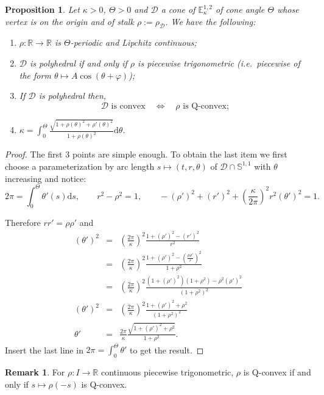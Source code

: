 \documentclass[a4paper,12pt]{article}
\def\D{\mathcal{D}}
\def\d{\mathrm{d}}
\def\D{\mathcal{D}}
\def\RR{\mathbb{R}}
\newcommand{\mass}[1]{{\mathbb E}^{1,2}_{#1}}
\def\SS{\mathbb{S}}
\def\Cone{\mathcal D}
\def\d{\mathrm{d}}
\def\D{\mathcal{D}}
\newtheorem{prop}[lem]{Proposition}
\theoremstyle{definition}
\newtheorem*{rem}{Remark}			 %
\begin{document}
					\begin{prop}\label{prop:T_convexe_base}
					Let $\kappa>0$, $\Theta>0$ and $\Cone$ a cone of $\mass{\kappa}$ of cone angle $\Theta$ whose vertex is on the origin and of stalk $\rho:=\rho_{\Cone}$. We have the following:
					\begin{enumerate}
					\item $\rho: \RR \rightarrow \RR$ is $\Theta$-periodic and Lipchitz continuous;
					\item $\D$ is polyhedral if and only if $\rho$ is piecewise trigonometric (i.e.\ piecewise of the form $\theta \mapsto A\cos(\theta+\varphi)$);
					\item If $\D$ is polyhedral then, 
					$$\Cone \text{ is convex} \quad \Leftrightarrow \quad\rho \text{ is Q-convex};$$ 
					\item $\displaystyle\kappa=\int_{0}^{\Theta} \frac{\sqrt{1+\rho(\theta)^2+\rho'(\theta)^2 }}{1+\rho(\theta)^2}\d \theta$.
					\end{enumerate}
					\end{prop}
					\begin{proof} The first 3 points are simple enough. 
					To obtain the last item we first choose a parameterization by arc length $s\mapsto (t,r,\theta)$ of $\D\cap \SS^{1,1}$ with $\theta$  increasing and notice:
					$$2\pi= \int_{0}^\Theta \theta'(s)\d s,\quad \quad
					r^2-\rho^2=1,\quad\quad -(\rho')^2+(r')^2+\left(\frac{\kappa}{2\pi}\right)^2 r^2(\theta')^2=1.$$
					
					Therefore $rr'= \rho\rho' $ and
					\begin{eqnarray*}
					 (\theta')^2&=&\left(\frac{2\pi}{\kappa}\right)^2 \frac{1+(\rho')^2-(r')^2}{r^2}\\
					 &=& \left(\frac{2\pi}{\kappa}\right)^2 \frac{1+(\rho')^2-\left( \frac{\rho \rho'}{r}\right)^2}{1+\rho^2}\\
					 &=& \left(\frac{2\pi}{\kappa}\right)^2 \frac{\left(1+(\rho')^2\right)\left(1+\rho^2\right)-\rho^2 (\rho')^2}{(1+\rho^2)^2}\\
					 (\theta')^2&=& \left(\frac{2\pi}{\kappa}\right)^2 \frac{1+(\rho')^2 + \rho^2}{(1+\rho^2)^2}\\
					 \theta'&=& \frac{2\pi}{\kappa}\frac{\sqrt{1+(\rho')^2 + \rho^2}}{1+\rho^2}.
					\end{eqnarray*}
					Insert the last line in $2\pi = \int_0^\Theta \theta'$ to get the result.
					\end{proof}
\begin{rem}\label{rem:inversion_sens} For $\rho:I\rightarrow\RR$ continuous piecewise trigonometric, $\rho$ is Q-convex if and only if $s\mapsto \rho(-s)$ is Q-convex.
					\end{rem}
					
\end{document}
